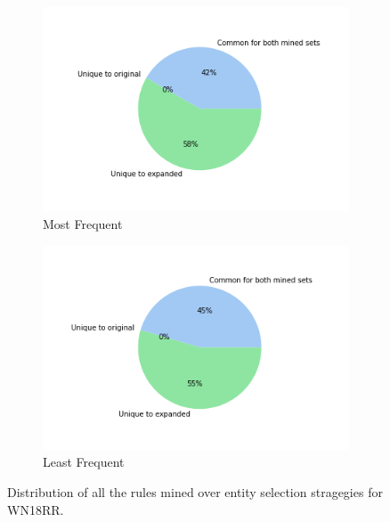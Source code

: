 \begin{figure}[h]
\begin{subfigure}[b]{0.49\textwidth}
            \centering 
            \includegraphics[width=\textwidth]{figures/results/entity_selection/pie_charts/most_frequent_wn18rr.png}
            \caption[]%
            {{\small Most Frequent}}    
            \label{fig:most_pie_wn18rr}
        \end{subfigure}
        \hfill
        \begin{subfigure}[b]{0.49\textwidth}   
            \centering 
            \includegraphics[width=\textwidth]{figures/results/entity_selection/pie_charts/least_frequent_wn18rr.png}
            \caption[]%
            {{\small Least Frequent}}    
            \label{fig:least_pie_wn18rr}
        \end{subfigure}
        \caption[]
        {\small Distribution of all the rules mined over entity selection stragegies for WN18RR.} 
        \label{fig:entity_pies_wn18rr}
    \end{figure}
    
